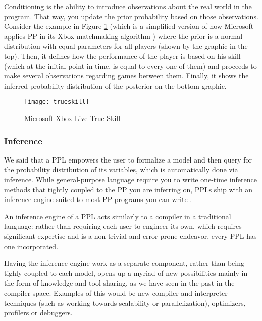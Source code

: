 Conditioning is the ability to introduce observations about the real world in
the program. That way, you update the prior probability based
on those observations. Consider the example in Figure \ref{fig:truskill} (which
is a simplified version of how Microsoft applies PP in its Xbox matchmaking
algorithm \cite{minka2012infer}) where the prior is a normal distribution with
equal parameters for all players (shown by the graphic in the top). Then, it
defines how the performance of the player is based on his skill (which at the initial
point in time, is equal to every one of them) and proceeds to make several
observations regarding games between them. Finally, it shows the inferred
probability distribution of the posterior on the bottom graphic.

\begin{figure}[t]
  \begin{center}
    \leavevmode
    \texttt{[image: trueskill]}
    \caption{Microsoft Xbox Live True Skill \cite{minka2012infer}}
    \label{fig:truskill}
  \end{center}
\end{figure}

\subsubsection{Inference}

We said that a PPL empowers the user to formalize a model and then query for the
probability distribution of its variables, which is automatically done via
inference. While general-purpose language require you to write one-time
inference methods that tightly coupled to the PP you are inferring on, PPLs
ship with an inference engine suited to most PP programs you can write
\cite{Freer2010}.

An inference engine of a PPL acts similarly to a compiler in a traditional
language: rather than requiring each user to engineer its own, which requires
significant expertise and is a non-trivial and error-prone endeavor, every PPL
has one incorporated.

Having the inference engine work as a separate component, rather than being
tighly coupled to each model, opens up a myriad of new
possibilities mainly in the form of knowledge and tool sharing, as we have
seen in the past in the compiler space. Examples of this would be new
compiler and interpreter techniques (such as working towards scalability or
parallelization), optimizers, profilers or debuggers.

